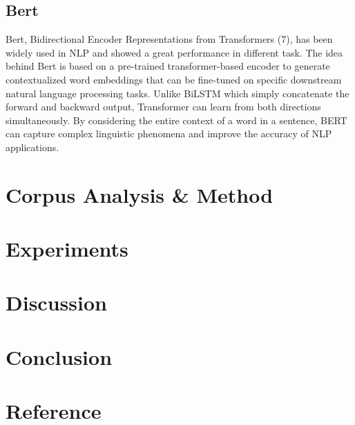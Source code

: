 \documentclass[11pt]{article}
\begin{document}
\subsection{Bert\cite{devlin2019bert}}
Bert, Bidirectional Encoder Representations from Transformers (7), has been widely used in NLP and showed a great performance in different task. The idea behind Bert\cite{devlin2019bert} is based on a pre-trained transformer-based encoder to generate contextualized word embeddings that can be fine-tuned on specific downstream natural language processing tasks. Unlike BiLSTM\cite{650093} which simply concatenate the forward and backward output, Transformer can learn from both directions simultaneously. By considering the entire context of a word in a sentence, BERT\cite{devlin2019bert} can capture complex linguistic phenomena and improve the accuracy of NLP applications.

\section{\bf Corpus Analysis \& Method}
\section{\bf Experiments}
\section{\bf Discussion}
\section{\bf Conclusion}
\section{\bf Reference}

 

\end{document}
